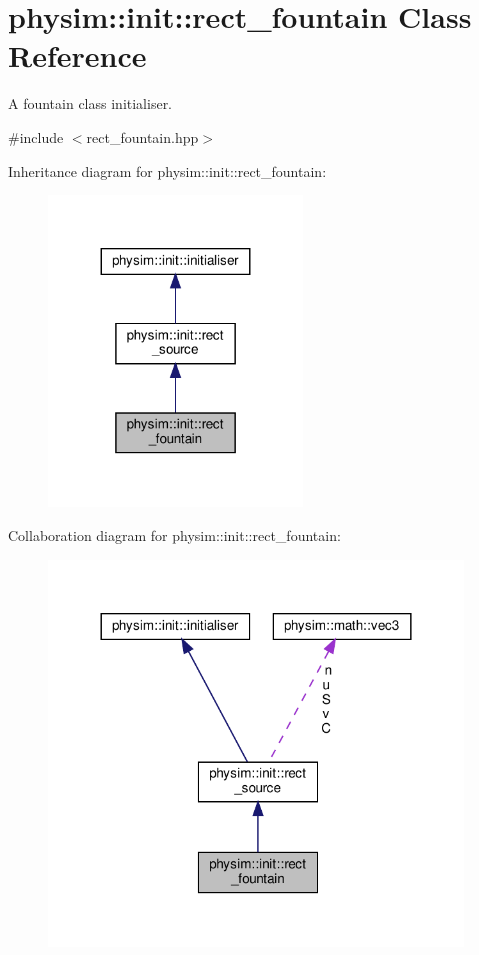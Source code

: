 \hypertarget{classphysim_1_1init_1_1rect__fountain}{}\section{physim\+:\+:init\+:\+:rect\+\_\+fountain Class Reference}
\label{classphysim_1_1init_1_1rect__fountain}


A fountain class initialiser.  




{\ttfamily \#include $<$rect\+\_\+fountain.\+hpp$>$}



Inheritance diagram for physim\+:\+:init\+:\+:rect\+\_\+fountain\+:\nopagebreak
\begin{figure}[H]
\begin{center}
\leavevmode
\includegraphics[width=191pt]{classphysim_1_1init_1_1rect__fountain__inherit__graph}
\end{center}
\end{figure}


Collaboration diagram for physim\+:\+:init\+:\+:rect\+\_\+fountain\+:\nopagebreak
\begin{figure}[H]
\begin{center}
\leavevmode
\includegraphics[width=312pt]{classphysim_1_1init_1_1rect__fountain__coll__graph}
\end{center}
\end{figure}
